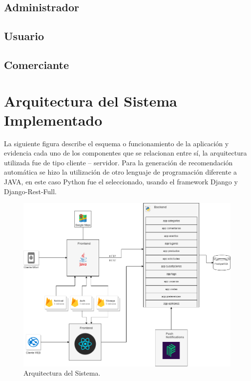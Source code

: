 \documentclass[12pt,letterpaper,openany]{book}
\begin{document}
\subsection{Administrador}
\subsection{Usuario}
\subsection{Comerciante}


\section{Arquitectura del Sistema Implementado}
La siguiente figura describe el esquema o funcionamiento de la aplicación y evidencia cada uno de los componentes que se relacionan entre sí, la arquitectura utilizada fue de tipo cliente – servidor. Para la generación de recomendación automática se hizo la utilización de otro lenguaje de programación diferente a JAVA, en este caso Python fue el seleccionado, usando el framework Django y Django-Rest-Full.
\begin{figure}[H]
\begin{center}
\includegraphics[width=13cm]{./imagenes/arquitectura}
\caption{Arquitectura del Sistema.}
\end{center}
\end{figure}
\end{document}
